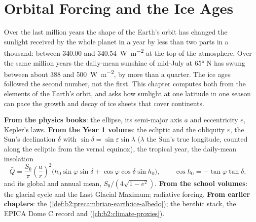 \chapter{Orbital Forcing and the Ice Ages}\label{ch:b2:orbital-forcing}

Over the last million years the shape of the Earth's orbit has changed the sunlight received by the
whole planet in a year by less than two parts in a thousand: between \num{340.00} and
\qty{340.54}{W.m^{-2}} at the top of the atmosphere. Over the same million years the daily-mean
sunshine of mid-July at \ang{65} N has swung between about 388 and \qty{500}{W.m^{-2}}, by more than
a quarter. The ice ages followed the second number, not the first. This chapter computes both
from the elements of the Earth's orbit, and asks how sunlight at one latitude in one season can
pace the growth and decay of ice sheets that cover continents.

\begin{recall}
\textbf{From the physics books}: the ellipse, its semi-major axis $a$ and eccentricity $e$, Kepler's
laws. \textbf{From the Year 1 volume}: the ecliptic and the obliquity $\varepsilon$, the Sun's
declination $\delta$ with $\sin\delta = \sin\varepsilon\sin\lambda$ ($\lambda$ the Sun's true
longitude, counted along the ecliptic from the vernal equinox), the tropical year, the daily-mean
insolation
\[
  \bar Q = \frac{S_0}{\pi}\left(\frac{a}{r}\right)^{2}\bigl(h_0\sin\varphi\sin\delta +
  \cos\varphi\cos\delta\sin h_0\bigr),\qquad \cos h_0 = -\tan\varphi\tan\delta ,
\]
and its global and annual mean, $S_0/(4\sqrt{1 - e^2})$. \textbf{From the school volumes}: the
glacial cycle and the Last Glacial Maximum; radiative forcing. \textbf{From earlier chapters}: the
 (\cref{def:b2:precambrian-earth:ice-albedo}); the benthic stack, the EPICA
Dome C record and  (\cref{ch:b2:climate-proxies}).
\end{recall}


